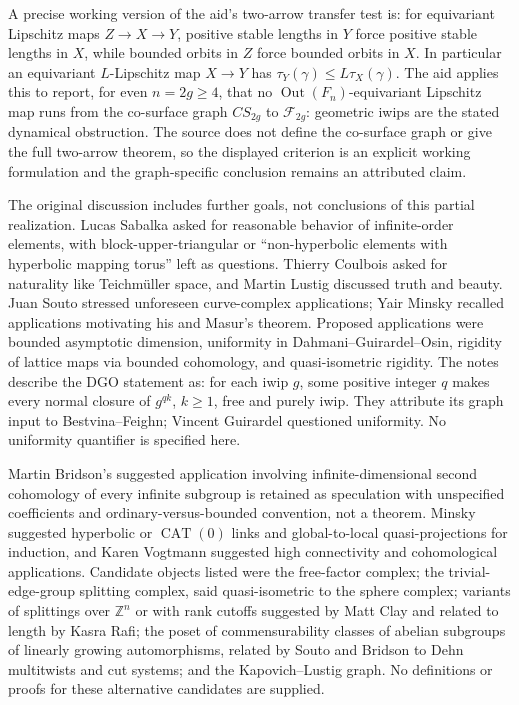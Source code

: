 \documentclass[11pt]{article}
\newcommand{\Z}{\mathbb{Z}}
\begin{document}
A precise working version of the aid's two-arrow transfer test is: for equivariant Lipschitz maps \(Z\to X\to Y\), positive stable lengths in \(Y\) force positive stable lengths in \(X\), while bounded orbits in \(Z\) force bounded orbits in \(X\). In particular an equivariant \(L\)-Lipschitz map \(X\to Y\) has \(\tau_Y(\gamma)\le L\tau_X(\gamma)\). The aid applies this to report, for even \(n=2g\ge4\), that no \(\operatorname{Out}(F_n)\)-equivariant Lipschitz map runs from the co-surface graph \(CS_{2g}\) to \(\mathcal F_{2g}\): geometric iwips are the stated dynamical obstruction. The source does not define the co-surface graph or give the full two-arrow theorem, so the displayed criterion is an explicit working formulation and the graph-specific conclusion remains an attributed claim.

The original discussion includes further goals, not conclusions of this partial realization. Lucas Sabalka asked for reasonable behavior of infinite-order elements, with block-upper-triangular or ``non-hyperbolic elements with hyperbolic mapping torus'' left as questions. Thierry Coulbois asked for naturality like Teichm\"uller space, and Martin Lustig discussed truth and beauty. Juan Souto stressed unforeseen curve-complex applications; Yair Minsky recalled applications motivating his and Masur's theorem. Proposed applications were bounded asymptotic dimension, uniformity in Dahmani--Guirardel--Osin, rigidity of lattice maps via bounded cohomology, and quasi-isometric rigidity. The notes describe the DGO statement as: for each iwip \(g\), some positive integer \(q\) makes every normal closure of \(g^{qk}\), \(k\ge1\), free and purely iwip. They attribute its graph input to Bestvina--Feighn; Vincent Guirardel questioned uniformity. No uniformity quantifier is specified here.

Martin Bridson's suggested application involving infinite-dimensional second cohomology of every infinite subgroup is retained as speculation with unspecified coefficients and ordinary-versus-bounded convention, not a theorem. Minsky suggested hyperbolic or \(\operatorname{CAT}(0)\) links and global-to-local quasi-projections for induction, and Karen Vogtmann suggested high connectivity and cohomological applications. Candidate objects listed were the free-factor complex; the trivial-edge-group splitting complex, said quasi-isometric to the sphere complex; variants of splittings over \(\Z^n\) or with rank cutoffs suggested by Matt Clay and related to length by Kasra Rafi; the poset of commensurability classes of abelian subgroups of linearly growing automorphisms, related by Souto and Bridson to Dehn multitwists and cut systems; and the Kapovich--Lustig graph. No definitions or proofs for these alternative candidates are supplied.
\end{document}
